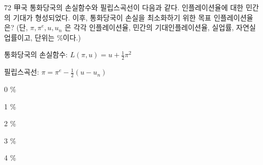 \begin{question}{72}
甲국 통화당국의 손실함수와 필립스곡선이 다음과 같다. 인플레이션율에 대한 민간의 기대가 형성되었다. 이후, 통화당국이 손실을 최소화하기 위한 목표 인플레이션율은? (단, $\pi ,\pi^{e},u,u_{n}$ 은 각각 인플레이션율, 민간의 기대인플레이션율, 실업률, 자연실업률이고, 단위는 \%이다.)
\begin{framedtext}
통화당국의 손실함수: $L(\pi ,u)=u+\frac{1}{2}\pi^{2}$ \par
필립스곡선: $\pi =\pi^{e}-\frac{1}{2}(u-u_{n})$ \par
\end{framedtext}
\begin{choices}
  \item 0 \%
  \item 1 \%
  \item 2 \%
  \item 3 \%
  \item 4 \%
\end{choices}
\end{question}

